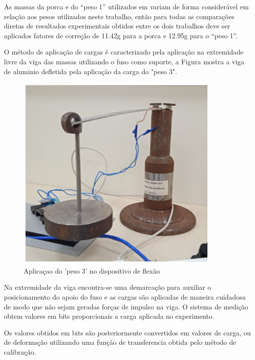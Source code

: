 As massas da porca e do “peso 1” utilizados em \autocite{Minela2017} variam de forma considerável em relação aos pesos utilizados neste trabalho, então para todas as comparações diretas de
resultados experimentais obtidos entre os dois trabalhos deve ser aplicados fatores de correção de 11.42g para a porca e 12.95g para o “peso 1”.

O método de aplicação de cargas é caracterizado pela aplicação na extremidade livre da viga das massas utilizando o fuso como suporte, a Figura mostra a viga de aluminio defletida pela aplicação da carga do "peso 3".

\begin{figure}[htb]
	\caption{\label{fig:2080} Aplicaçao do 'peso 3' no dispositivo de flexão}
	\begin{center}
		\includegraphics[width=\textwidth]{pictures/2080.png}
	\end{center}
\end{figure}

Na extremidade da viga encontra-se uma demarcação para auxiliar o posicionamento do apoio do fuso e as cargas são aplicadas de maneira cuidadosa de modo que não sejam geradas forças de impulso na viga.
O sistema de medição obtem valores em bits proporcionais a carga aplicada no experimento.

Os valores obtidos em bits são posteriormente convertidos em valores de carga, ou de deformação utilizando uma função de transferencia obtida pelo método de calibração.
